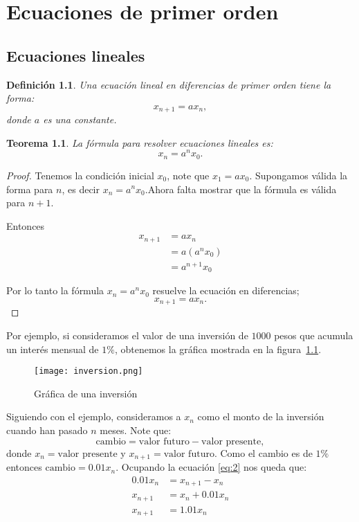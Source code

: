 \documentclass{report}
\newtheorem{teorema}{Teorema}[chapter]
\newtheorem{definicion}{Definición}[chapter]
\begin{document}
\chapter{Ecuaciones de primer orden}

\section{Ecuaciones lineales}

\begin{definicion}
Una \emph{ecuación lineal en diferencias de primer orden} tiene la forma:
\begin{equation}
  \label{lineal}
  x_{n+1}=ax_n,
\end{equation}
donde $a$ es una constante.
\end{definicion}
\begin{teorema}
La fórmula para resolver ecuaciones lineales es:
\begin{equation}
  \label{rum}
  x_n=a^nx_0.
\end{equation}
\end{teorema}

\begin{proof}
Tenemos la condición inicial $x_0$, note que $x_1=ax_0$.  Supongamos
válida la forma para $n$, es decir $x_n=a^nx_0$.Ahora falta mostrar que
la fórmula es válida para $n+1$.

Entonces
\begin{align*}
  x_{n+1}&=ax_n\\
        &=a(a^nx_0)\\
       &=a^{n+1}x_0
\end{align*}

Por lo tanto la fórmula $x_n=a^nx_0$ resuelve la ecuación en
diferencias; $$x_{n+1}=ax_n.$$
\end{proof}

Por ejemplo, si consideramos el valor de una inversión de $1000$ pesos
que acumula un interés mensual de $1\%$, obtenemos la gráfica mostrada
en la figura~\ref{inversion}.

\begin{figure}
  \centering
  \texttt{[image: inversion.png]}
  \caption{Gráfica de una inversión}
  \label{inversion}
\end{figure}

Siguiendo con el ejemplo, consideramos a $x_n$ como el monto
de la inversión cuando han pasado $n$ meses.  Note que:
\begin{equation}
  \label{eq:2}
  \text{cambio}=\text{valor futuro}-\text{valor presente},
\end{equation}
donde $x_n=\text{valor presente}$ y $x_{n+1}=\text{valor futuro}$.
Como el cambio es de $1\%$ entonces $\text{cambio}=0.01x_n$.  Ocupando la ecuación
\eqref{eq:2} nos queda que:
\begin{align*}
  0.01x_n&=x_{n+1}-x_n\\
  x_{n+1}&=x_n+0.01x_n\\
 x_{n+1}&=1.01x_n
\end{align*}
\end{document}
